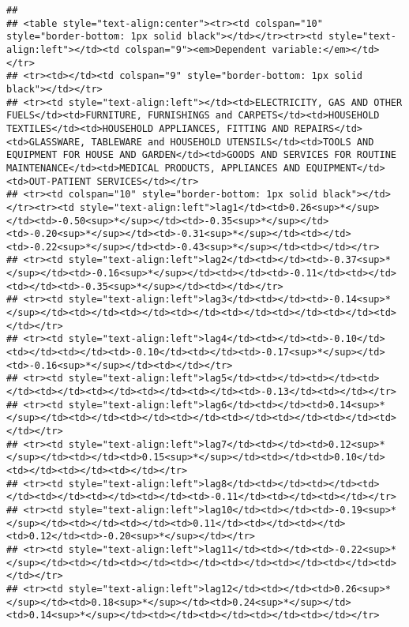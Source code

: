 \documentclass[
]{article}
\begin{document}
\begin{verbatim}
## 
## <table style="text-align:center"><tr><td colspan="10" style="border-bottom: 1px solid black"></td></tr><tr><td style="text-align:left"></td><td colspan="9"><em>Dependent variable:</em></td></tr>
## <tr><td></td><td colspan="9" style="border-bottom: 1px solid black"></td></tr>
## <tr><td style="text-align:left"></td><td>ELECTRICITY, GAS AND OTHER FUELS</td><td>FURNITURE, FURNISHINGS and CARPETS</td><td>HOUSEHOLD TEXTILES</td><td>HOUSEHOLD APPLIANCES, FITTING AND REPAIRS</td><td>GLASSWARE, TABLEWARE and HOUSEHOLD UTENSILS</td><td>TOOLS AND EQUIPMENT FOR HOUSE AND GARDEN</td><td>GOODS AND SERVICES FOR ROUTINE MAINTENANCE</td><td>MEDICAL PRODUCTS, APPLIANCES AND EQUIPMENT</td><td>OUT-PATIENT SERVICES</td></tr>
## <tr><td colspan="10" style="border-bottom: 1px solid black"></td></tr><tr><td style="text-align:left">lag1</td><td>0.26<sup>*</sup></td><td>-0.50<sup>*</sup></td><td>-0.35<sup>*</sup></td><td>-0.20<sup>*</sup></td><td>-0.31<sup>*</sup></td><td></td><td>-0.22<sup>*</sup></td><td>-0.43<sup>*</sup></td><td></td></tr>
## <tr><td style="text-align:left">lag2</td><td></td><td>-0.37<sup>*</sup></td><td>-0.16<sup>*</sup></td><td></td><td>-0.11</td><td></td><td></td><td>-0.35<sup>*</sup></td><td></td></tr>
## <tr><td style="text-align:left">lag3</td><td></td><td>-0.14<sup>*</sup></td><td></td><td></td><td></td><td></td><td></td><td></td><td></td></tr>
## <tr><td style="text-align:left">lag4</td><td></td><td>-0.10</td><td></td><td></td><td>-0.10</td><td></td><td>-0.17<sup>*</sup></td><td>-0.16<sup>*</sup></td><td></td></tr>
## <tr><td style="text-align:left">lag5</td><td></td><td></td><td></td><td></td><td></td><td></td><td></td><td>-0.13</td><td></td></tr>
## <tr><td style="text-align:left">lag6</td><td></td><td>0.14<sup>*</sup></td><td></td><td></td><td></td><td></td><td></td><td></td><td></td></tr>
## <tr><td style="text-align:left">lag7</td><td></td><td>0.12<sup>*</sup></td><td></td><td>0.15<sup>*</sup></td><td></td><td>0.10</td><td></td><td></td><td></td></tr>
## <tr><td style="text-align:left">lag8</td><td></td><td></td><td></td><td></td><td></td><td></td><td>-0.11</td><td></td><td></td></tr>
## <tr><td style="text-align:left">lag10</td><td></td><td>-0.19<sup>*</sup></td><td></td><td></td><td>0.11</td><td></td><td></td><td>0.12</td><td>-0.20<sup>*</sup></td></tr>
## <tr><td style="text-align:left">lag11</td><td></td><td>-0.22<sup>*</sup></td><td></td><td></td><td></td><td></td><td></td><td></td><td></td></tr>
## <tr><td style="text-align:left">lag12</td><td></td><td>0.26<sup>*</sup></td><td>0.18<sup>*</sup></td><td>0.24<sup>*</sup></td><td>0.14<sup>*</sup></td><td></td><td></td><td></td><td></td></tr>

\end{verbatim}
\end{document}
